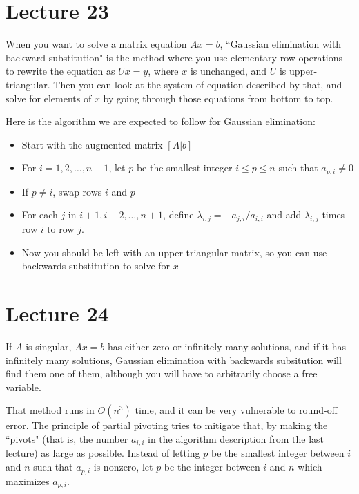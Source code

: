 \documentclass{article}
\begin{document}
\section{Lecture 23}
When you want to solve a matrix equation $Ax=b$, ``Gaussian elimination with backward substitution" is the method where you use elementary row operations to rewrite the equation as $Ux=y$, where $x$ is unchanged, and $U$ is upper-triangular. Then you can look at the system of equation described by that, and solve for elements of $x$ by going through those equations from bottom to top.
\par
Here is the algorithm we are expected to follow for Gaussian elimination:
\begin{itemize}
    \item Start with the augmented matrix $[A|b]$
    \item For $i=1,2,\dots, n-1$, let $p$ be the smallest integer $i\leq p \leq n$ such that $a_{p,i} \neq 0$
    \item If $p \neq i$, swap rows $i$ and $p$
    \item For each $j$ in $i+1,i+2,\dots, n+1$, define $\lambda_{i,j}=-a_{j,i}/a_{i,i}$ and add $\lambda_{i,j}$ times row $i$ to row $j$.
    \item Now you should be left with an upper triangular matrix, so you can use backwards substitution to solve for $x$
\end{itemize}

\section{Lecture 24}
If $A$ is singular, $Ax=b$ has either zero or infinitely many solutions, and if it has infinitely many solutions, Gaussian elimination with backwards subsitution will find them one of them, although you will have to arbitrarily choose a free variable.
\par
That method runs in $O(n^3)$ time, and it can be very vulnerable to round-off error. The principle of partial pivoting tries to mitigate that, by making the ``pivots" (that is, the number $a_{i,i}$ in the algorithm description from the last lecture) as large as possible. Instead of letting $p$ be the smallest integer between $i$ and $n$ such that $a_{p,i}$ is nonzero, let $p$ be the integer between $i$ and $n$ which maximizes $a_{p,i}$.
\end{document}
